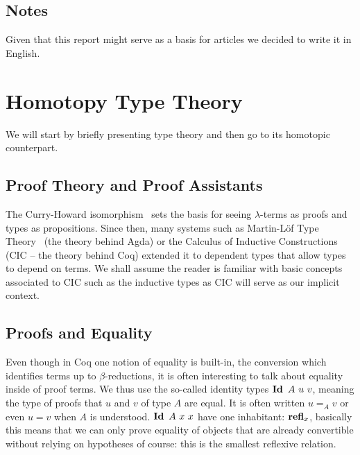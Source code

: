 \documentclass[11pt]{article}
\theoremstyle{plain}
\theoremstyle{remark}
\begin{document}
\subsection*{Notes}

Given that this report might serve as a basis for articles we decided to write
it in English.

\newpage
\pagestyle{plain} %

\section{Homotopy Type Theory}

We will start by briefly presenting type theory and then go to its homotopic
counterpart.

\subsection{Proof Theory and Proof Assistants}

The Curry-Howard isomorphism~\cite{howard1995formulae} sets the basis for seeing
$\lambda$-terms as proofs and types as propositions. Since then, many systems
such as Martin-L\" of Type Theory~\cite{manin1975intuitionistic} (the theory
behind Agda) or the Calculus of Inductive Constructions (CIC -- the theory
behind Coq) extended it to dependent
types that allow types to depend on terms.
We shall assume the reader is familiar with basic concepts associated to CIC
such as the inductive types as CIC will serve as our implicit context.

\subsection{Proofs and Equality}

Even though in Coq one notion of equality is built-in, the conversion which
identifies terms up to $\beta$-reductions, it is often interesting to talk
about equality inside of proof terms.
We thus use the so-called identity types $\Id\ A\ u\ v$, meaning the type of
proofs that $u$ and $v$ of type $A$ are equal. It is often written
$u =_A v$ or even $u = v$ when $A$ is understood.
$\operatorname{\mathbf{Id}}\ A\ x\ x$ have one inhabitant: $\operatorname{\mathbf{refl}}_x$,
basically this means that we can only prove equality of objects that are already
convertible without relying on hypotheses of course: this is the smallest
reflexive relation.
\end{document}
